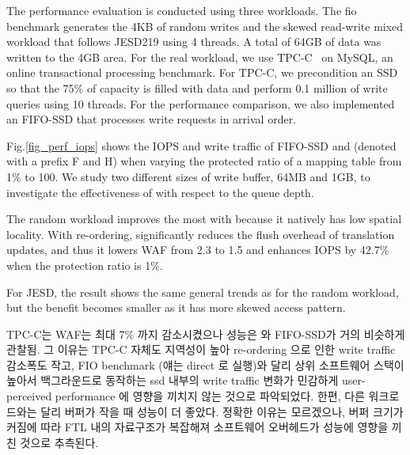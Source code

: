 The performance evaluation is conducted using three workloads.
The fio benchmark generates the 4KB of random writes and the
skewed read-write mixed workload that follows JESD219 using 4 threads. A
total of 64GB of data was written to the 4GB area. For the real workload, we use 
TPC-C~\cite{council1990tpc} on MySQL, an online transactional processing benchmark.
For TPC-C, we precondition an SSD so that the 75\% of capacity is filled with data
and perform 0.1 million of write queries using 10 threads.
For the performance comparison, we also implemented an FIFO-SSD that processes 
write requests in arrival order.  

Fig.\ref{fig_perf_iops} shows the IOPS and write traffic of FIFO-SSD and \ours{} (denoted with a prefix F and H) when varying the protected ratio of a mapping table from 1\% to 100. 
We study two different sizes of write
buffer, 64MB and 1GB, to investigate the effectiveness of \ours{} with respect
to the queue depth. 

The random workload improves the most with \ours{} because it natively has low spatial locality.
With re-ordering, \ours{} significantly reduces the flush overhead of translation updates, and thus it 
lowers WAF from 2.3 to 1.5 and enhances IOPS by 42.7\% when the protection ratio is 1\%. 

For JESD, the result shows the same general trends as for the random workload, but the benefit 
becomes smaller as it has more skewed access pattern.

TPC-C는 WAF는 최대 7\% 까지 감소시켰으나 성능은 \ours{}와 FIFO-SSD가 거의 비슷하게 관찰됨. 
그 이유는 TPC-C 자체도 지역성이 높아 re-ordering 으로 인한 write traffic 감소폭도 작고, FIO benchmark (얘는 direct 로 실행)와 달리 상위 소프트웨어 스택이 높아서 백그라운드로 동작하는 ssd 내부의 write traffic 변화가 민감하게 user-perceived performance 에 영향을 끼치지 않는 것으로 파악되었다. 
한편, 다른 워크로드와는 달리 버퍼가 작을 때 성능이 더 좋았다. 정확한 이유는 모르겠으나, 버퍼 크기가 커짐에 따라 FTL 내의 자료구조가 복잡해져 소프트웨어 오버헤드가 성능에 영향을 끼친 것으로 추측된다. 


